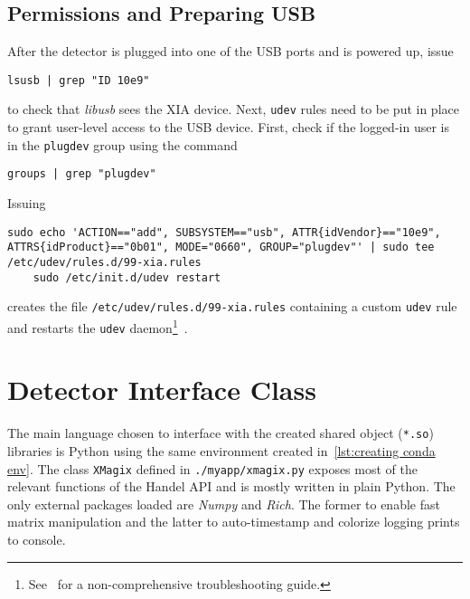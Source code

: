         \subsection{Permissions and Preparing USB}\label{sec:permissions and preparing usb}
            After the detector is plugged into one of the USB ports and is powered up, issue
            \begin{lstlisting}[style=mybash, numbers=none, label={lst:lsusb}]
    lsusb | grep "ID 10e9"
            \end{lstlisting}
            to check that \textit{libusb} sees the XIA device.
            Next, \texttt{udev} rules need to be put in place to grant user-level access to the USB device.
            First, check if the logged-in user is in the \texttt{plugdev} group using the command
            \begin{lstlisting}[style=mybash, numbers=none, label={lst:get plugdev group}]
    groups | grep "plugdev"
            \end{lstlisting}
            Issuing
            \begin{lstlisting}[style=mybash, numbers=none, label={lst:udev}]
    sudo echo 'ACTION=="add", SUBSYSTEM=="usb", ATTR{idVendor}=="10e9", ATTRS{idProduct}=="0b01", MODE="0660", GROUP="plugdev"' | sudo tee /etc/udev/rules.d/99-xia.rules
    sudo /etc/init.d/udev restart
            \end{lstlisting}
            creates the file \texttt{/etc/udev/rules.d/99-xia.rules} containing a custom \texttt{udev} rule and restarts the \texttt{udev} daemon\footnote{See~\cite{Software.XraythesisHandel.2023} for a non-comprehensive troubleshooting guide.}~\cite{Software.HandelRelease.2023,Software.XraythesisHandel.2023}.

    \clearpage
    \section{Detector Interface Class}\label{sec:detector interface}
        The main language chosen to interface with the created shared object (\texttt{*.so}) libraries is Python using the same environment created in~\cref{lst:creating conda env}.
        The class \texttt{XMagix} defined in \texttt{./myapp/xmagix.py} exposes most of the relevant functions of the Handel API and is mostly written in plain Python.
        The only external packages loaded are \textit{Numpy} and \textit{Rich}.
        The former to enable fast matrix manipulation and the latter to auto-timestamp and colorize logging prints to console.\par\medskip

